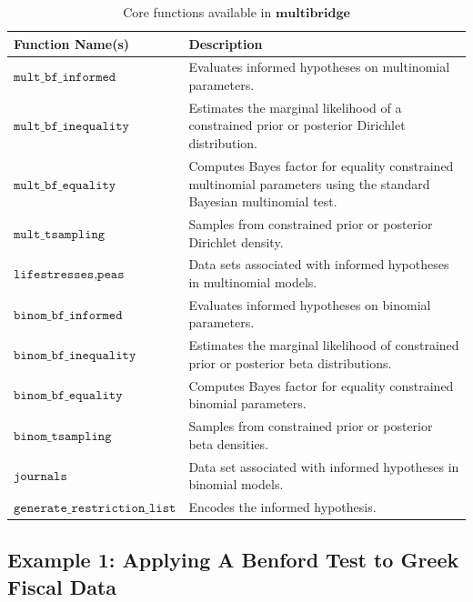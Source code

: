 \documentclass[
  english,
  man,floatsintext]{apa6}
\begin{document}
\begin{table}[H]
\caption {Core functions available in $\textbf{multibridge}$}
\label{table:core_functions}
\begin{center}
\begin{tabular}{p{5.5cm}p{10.5cm}}
        \toprule
Function Name(s) & Description \\\midrule
$\texttt{mult\_bf\_informed}$ & Evaluates informed hypotheses on multinomial parameters.  \\
$\texttt{mult\_bf\_inequality}$ & Estimates the marginal likelihood of a constrained prior or posterior Dirichlet distribution.  \\
$\texttt{mult\_bf\_equality}$ & Computes Bayes factor for equality constrained multinomial parameters using the standard Bayesian multinomial test.  \\
$\texttt{mult\_tsampling}$ & Samples from constrained prior or posterior Dirichlet density.\\
$ \texttt{lifestresses}, \texttt{peas}$ & Data sets associated with informed hypotheses in multinomial models.\\\midrule
$\texttt{binom\_bf\_informed}$ & Evaluates informed hypotheses on binomial parameters.  \\
$\texttt{binom\_bf\_inequality}$ & Estimates the marginal likelihood of constrained prior or posterior beta distributions.\\
$\texttt{binom\_bf\_equality}$ & Computes Bayes factor for equality constrained binomial parameters.  \\
$\texttt{binom\_tsampling}$ & Samples from constrained prior or posterior beta densities.\\
$ \texttt{journals}$ & Data set associated with informed hypotheses in binomial models.\\\midrule
$ \texttt{generate\_restriction\_list}$ & Encodes the informed hypothesis.\\
\bottomrule
\end{tabular}
\end{center}
\end{table}

\hypertarget{example-1-applying-a-benford-test-to-greek-fiscal-data}{%
\subsection{Example 1: Applying A Benford Test to Greek Fiscal Data}\label{example-1-applying-a-benford-test-to-greek-fiscal-data}}
\end{document}
